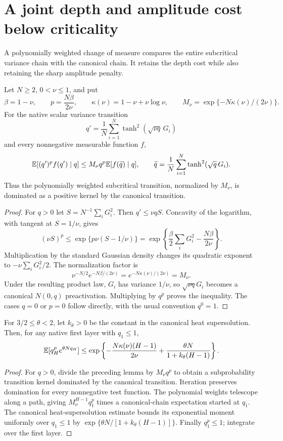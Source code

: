 \section{A joint depth and amplitude cost below criticality}
\label{sec:joint-prefactor-entropy}
A polynomially weighted change of measure compares the entire subcritical variance chain with the canonical chain. It retains the depth cost while also retaining the sharp amplitude penalty.

\begin{lemma}
\label{lem:joint-kernel-domination}
Let $N\ge2$, $0<\nu\le1$, and put
\[
 \beta=1-\nu,\qquad p=\frac{N\beta}{2\nu},\qquad
 \kappa(\nu)=1-\nu+\nu\log\nu,\qquad
 M_\nu=\exp\{-N\kappa(\nu)/(2\nu)\}.
\]
For the native scalar variance transition
\[
 q'=\frac1N\sum_{i=1}^N\tanh^2(\sqrt{\nu q}\,G_i)
\]
and every nonnegative measurable function $f$,
\[
 \mathbb E[(q')^p f(q')\mid q]
 \le M_\nu q^p\mathbb E[f(\widetilde q)\mid q],
 \qquad
 \widetilde q=\frac1N\sum_{i=1}^N\tanh^2(\sqrt q\,G_i).
\]
Thus the polynomially weighted subcritical transition, normalized by $M_\nu$, is dominated as a positive kernel by the canonical transition.
\end{lemma}
\begin{proof}
For $q>0$ let $S=N^{-1}\sum_iG_i^2$. Then $q'\le\nu qS$. Concavity of the logarithm, with tangent at $S=1/\nu$, gives
\[
 (\nu S)^p\le
 \exp\{p\nu(S-1/\nu)\}
 =\exp\left\{\frac\beta2\sum_iG_i^2-\frac{N\beta}{2\nu}\right\}.
\]
Multiplication by the standard Gaussian density changes its quadratic exponent to $-\nu\sum_iG_i^2/2$. The normalization factor is
\[
 \nu^{-N/2}e^{-N\beta/(2\nu)}
       =e^{-N\kappa(\nu)/(2\nu)}=M_\nu.
\]
Under the resulting product law, $G_i$ has variance $1/\nu$, so $\sqrt{\nu q}G_i$ becomes a canonical $N(0,q)$ preactivation. Multiplying by $q^p$ proves the inequality. The cases $q=0$ or $p=0$ follow directly, with the usual convention $q^0=1$.
\end{proof}

\begin{corollary}
\label{cor:joint-variance-moment}
For $3/2\le\theta<2$, let $k_\theta>0$ be the constant in the canonical heat supersolution. Then, for any native first layer with $q_1\le1$,
\[
 \mathbb E[q_H^p e^{\theta Nq_H}]
 \le\exp\left\{-\frac{N\kappa(\nu)(H-1)}{2\nu}
             +\frac{\theta N}{1+k_\theta(H-1)}\right\}.
\]
\end{corollary}
\begin{proof}
For $q>0$, divide the preceding lemma by $M_\nu q^p$ to obtain a subprobability transition kernel dominated by the canonical transition. Iteration preserves domination for every nonnegative test function. The polynomial weights telescope along a path, giving $M_\nu^{H-1}q_1^p$ times a canonical-chain expectation started at $q_1$. The canonical heat-supersolution estimate bounds its exponential moment uniformly over $q_1\le1$ by $\exp\{\theta N/[1+k_\theta(H-1)]\}$. Finally $q_1^p\le1$; integrate over the first layer.
\end{proof}

